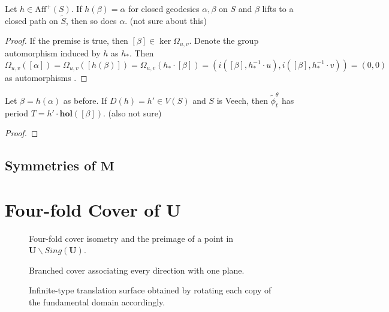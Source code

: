 \documentclass[]{article}
\def\hol{\mathbf{hol}}
\def\bM{\mathbf{M}}
\begin{document}
\begin{lem}
Let $h\in\text{Aff}^+(S)$. If $h(\beta)=\alpha$ for closed geodesics $\alpha,\beta$ on $S$ and $\beta$ lifts to a closed path on $\tilde{S}$, then so does $\alpha$. (not sure about this)
\begin{proof}
If the premise is true, then $[\beta]\in\ker\Omega_{u,v}$. Denote the group automorphism induced by $h$ as $h_*$. Then $\Omega_{u,v}([\alpha])=\Omega_{u,v}([h(\beta)])=\Omega_{u,v}(h_*\cdot[\beta])=(i([\beta],h_*^{-1}\cdot u),i([\beta],h_*^{-1}\cdot v))=(0,0)$ as automorphisms .
\end{proof}
\end{lem}

\begin{lem}
Let $\beta=h(\alpha)$ as before. If $D(h)=h'\in V(S)$ and $S$ is Veech, then $\tilde{\phi}^\theta_t$ has period $T=h'\cdot\hol([\beta])$. (also not sure)
\begin{proof}

\end{proof}
\end{lem}



\subsection{Symmetries of $\bM$}



\section{Four-fold Cover of $\mathbf{U}$}

\begin{figure}[H]
\centering
\hspace{0.5in}
\caption{Four-fold cover isometry and the preimage of a point in $\mathbf U \backslash Sing(\mathbf U)$.}
\end{figure}

\begin{figure}[H]
\centering

\label{fig:utilda0}
\caption{Branched cover associating every direction with one plane.}
\end{figure}

\begin{figure}[H]
\centering

\caption{Infinite-type translation surface obtained by rotating each copy of the fundamental domain accordingly.}
\label{fig:utilda}
\end{figure}
\end{document}
